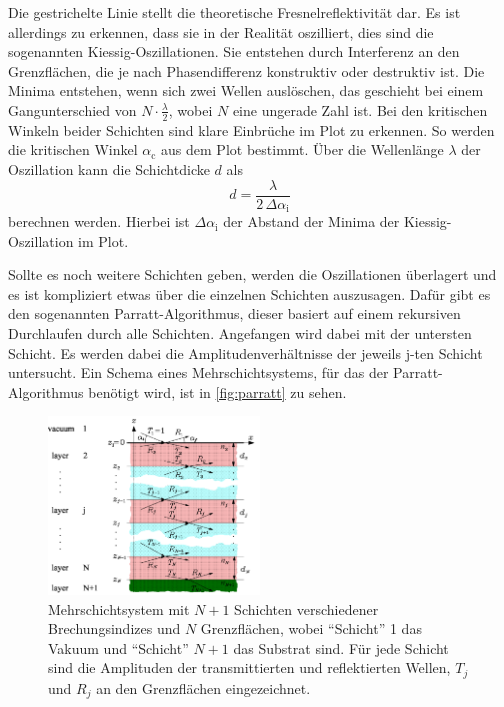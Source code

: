 Die gestrichelte Linie stellt die theoretische Fresnelreflektivität dar.
Es ist allerdings zu erkennen, dass sie in der Realität oszilliert, dies sind die sogenannten Kiessig-Oszillationen. 
Sie entstehen durch Interferenz an den Grenzflächen, die je nach Phasendifferenz konstruktiv oder destruktiv ist.
Die Minima entstehen, wenn sich zwei Wellen auslöschen, das geschieht bei einem Gangunterschied von $ N \cdot \frac{\lambda}{2}$, wobei $N$ eine ungerade Zahl ist.
Bei den kritischen Winkeln beider Schichten sind klare Einbrüche im Plot zu erkennen.
So werden die kritischen Winkel $\alpha _\text{c}$ aus dem Plot bestimmt.
Über die Wellenlänge $\lambda$ der Oszillation kann die Schichtdicke $d$ als 
\begin{equation}
    d = \frac{\lambda}{2 \, \Delta \alpha _\text{i}}
    \label{eq:schicht}
\end{equation}
berechnen werden.
Hierbei ist $\Delta \alpha _\text{i}$ der Abstand der Minima der Kiessig-Oszillation im Plot.

Sollte es noch weitere Schichten geben, werden die Oszillationen überlagert und es ist kompliziert etwas über die einzelnen Schichten auszusagen.
Dafür gibt es den sogenannten Parratt-Algorithmus, dieser basiert auf einem rekursiven Durchlaufen durch alle Schichten.
Angefangen wird dabei mit der untersten Schicht.
Es werden dabei die Amplitudenverhältnisse der jeweils j-ten Schicht untersucht.
Ein Schema eines Mehrschichtsystems, für das der Parratt-Algorithmus benötigt wird, ist in \autoref{fig:parratt} zu sehen.

\begin{figure}
    \centering
    \includegraphics[width=0.5\textwidth]{images/parratt_algorithmus.png}
    \caption{Mehrschichtsystem mit $N + 1$ Schichten verschiedener Brechungsindizes und $N$ Grenzflächen,
    wobei \enquote{Schicht} 1 das Vakuum und \enquote{Schicht} $N + 1$ das Substrat sind. Für jede
    Schicht sind die Amplituden der transmittierten und reflektierten Wellen, $T_j$ und $R_j$ an den
    Grenzflächen eingezeichnet.\cite{V44old}}
    \label{fig:parratt}
\end{figure}

